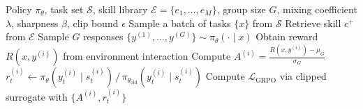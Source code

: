 \begin{algorithm}[h]
  \caption{\methodname}
  \label{alg:cgtd}                     
  \begin{algorithmic}[1]                                                                        
  \Require Policy $\pi_{\theta}$, task set $\mathcal{S}$, skill library $\mathcal{E} =          
  \{e_1,\dots,e_M\}$, group size $G$, mixing coefficient $\lambda$, sharpness $\beta$, clip     
  bound $\epsilon$                                                                              
      \State Sample a batch of tasks $\{x\}$ from $\mathcal{S}$                                 
          \State Retrieve skill $c^{+}$ from $\mathcal{E}$    
          \State {}                                          
          \State Sample $G$ responses $\{y^{(1)},\dots,y^{(G)}\} \sim \pi_{\theta}(\cdot \mid   
  x)$                                                                                           
          \State {}                  
              \State Obtain reward $R(x, y^{(i)})$ from environment interaction                 
          \EndFor                                                                               
          \State Compute $A^{(i)} = \frac{R(x,y^{(i)}) - \mu_G}{\sigma_G}$                      
          \State {}                                           
                  \State $r_t^{(i)} \gets \pi_{\theta}(y_t^{(i)} \mid s_t^{(i)}) \,/\,          
  \pi_{\theta_{\mathrm{old}}}(y_t^{(i)} \mid s_t^{(i)})$                                        
              \EndFor                                                                           
          \EndFor                                                                               
          \State Compute $\mathcal{L}_{\mathrm{GRPO}}$ via clipped surrogate with $\{A^{(i)},   
  r_t^{(i)}\}$                                                                                  

\end{algorithmic}
\end{algorithm}
